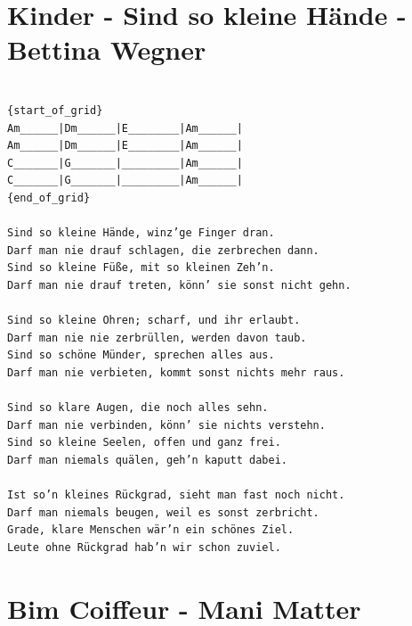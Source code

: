 \documentclass[]{book}
\let\stdsection\section
\renewcommand\section{\clearpage\stdsection}
\begin{document}
\hypertarget{kinder---sind-so-kleine-hande---bettina-wegner}{%
\section{Kinder - Sind so kleine Hände - Bettina Wegner}\label{kinder---sind-so-kleine-hande---bettina-wegner}}

\begin{verbatim}

{start_of_grid}
Am______|Dm______|E________|Am______|
Am______|Dm______|E________|Am______|
C_______|G_______|_________|Am______|
C_______|G_______|_________|Am______|
{end_of_grid}

Sind so kleine Hände, winz’ge Finger dran.
Darf man nie drauf schlagen, die zerbrechen dann.
Sind so kleine Füße, mit so kleinen Zeh’n.
Darf man nie drauf treten, könn’ sie sonst nicht gehn.

Sind so kleine Ohren; scharf, und ihr erlaubt.
Darf man nie nie zerbrüllen, werden davon taub.
Sind so schöne Münder, sprechen alles aus.
Darf man nie verbieten, kommt sonst nichts mehr raus.

Sind so klare Augen, die noch alles sehn.
Darf man nie verbinden, könn’ sie nichts verstehn.
Sind so kleine Seelen, offen und ganz frei.
Darf man niemals quälen, geh’n kaputt dabei.

Ist so’n kleines Rückgrad, sieht man fast noch nicht.
Darf man niemals beugen, weil es sonst zerbricht.
Grade, klare Menschen wär’n ein schönes Ziel.
Leute ohne Rückgrad hab’n wir schon zuviel.
\end{verbatim}

\hypertarget{bim-coiffeur---mani-matter}{%
\section{Bim Coiffeur - Mani Matter}\label{bim-coiffeur---mani-matter}}
\end{document}
